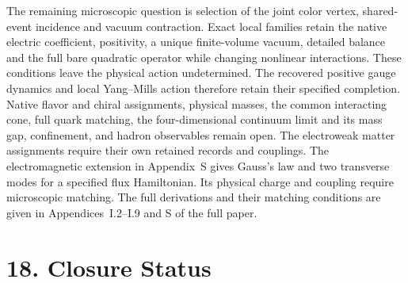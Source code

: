 \documentclass[11pt]{article}
\begin{document}
The remaining microscopic question is selection of the joint color
vertex, shared-event incidence and vacuum contraction. Exact local
families retain the native electric coefficient, positivity, a unique
finite-volume vacuum, detailed balance and the full bare quadratic operator while
changing nonlinear interactions. These conditions leave the physical
action undetermined. The recovered positive gauge dynamics and local
Yang--Mills action therefore retain their specified completion.
Native flavor and chiral assignments, physical masses, the common
interacting cone, full quark matching, the four-dimensional continuum limit and its mass gap, confinement, and hadron
observables remain open. The electroweak matter assignments require
their own retained records and couplings. The electromagnetic extension
in Appendix~S gives Gauss's law and two transverse modes for a specified
flux Hamiltonian. Its physical charge and coupling require microscopic matching. The full derivations and
their matching conditions are given in Appendices~I.2--I.9 and S of the full paper.

\section{18. Closure Status}
\end{document}
